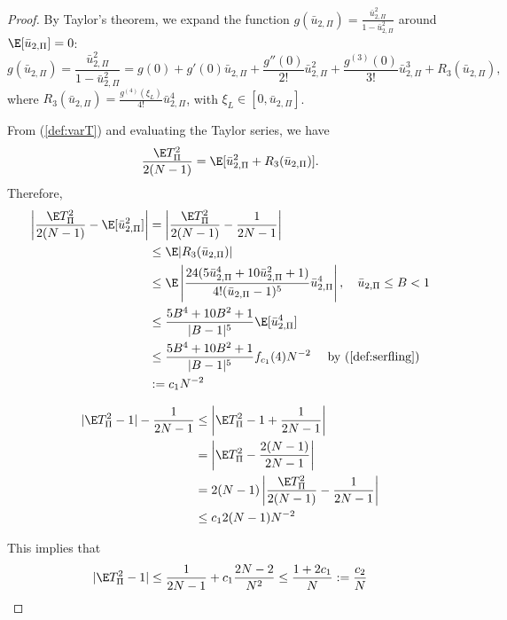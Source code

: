 \begin{proof}
  By Taylor's theorem, we expand the function $g(\bar{u}_{2,\Pi}) =
  \frac{\bar{u}_{2,\Pi}^2}{1-\bar{u}_{2,\Pi}^2}$ around $\E[\bar{u}_{2,\Pi}] = 0$: 
  \begin{equation*}
    g(\bar{u}_{2,\Pi}) = \frac{\bar{u}_{2,\Pi}^2}{1-\bar{u}_{2,\Pi}^2} = g(0) + g'(0)
    \bar{u}_{2,\Pi} + \frac{g''(0)}{2!}\bar{u}_{2,\Pi}^2 +
    \frac{g^{(3)}(0)}{3!}\bar{u}_{2,\Pi}^3 + R_3(\bar{u}_{2,\Pi}),
  \end{equation*}
  where $R_3(\bar{u}_{2,\Pi}) = \frac{g^{(4)}(\xi_L)}{4!}\bar{u}_{2,\Pi}^4$, with
  $\xi_L \in [0, \bar{u}_{2,\Pi}]$.

  From (\ref{def:varT}) and evaluating the Taylor series, we have 
  \begin{equation*}
    \frac{\E T_{\Pi}^2}{2(N-1)} = \E[\bar{u}_{2,\Pi}^2 + R_3(\bar{u}_{2,\Pi})].
  \end{equation*}
  Therefore,
  \begin{align*}
    \left | \frac{\E T_{\Pi}^2}{2(N-1)} - \E[\bar{u}_{2,\Pi}^2] \right | 
    &= \left | \frac{\E T_{\Pi}^2}{2(N-1)} - \frac{1}{2N-1} \right | \\
    &\leq  \E |R_3(\bar{u}_{2,\Pi})| \\
    &\leq \E \left | \frac{24(5\bar{u}_{2,\Pi}^4 + 10  \bar{u}_{2,\Pi}^2 +
        1)}{4!(\bar{u}_{2,\Pi}-1)^5}\bar{u}_{2,\Pi}^4  \right |, \quad
    \bar{u}_{2,\Pi} \leq B < 1 \\
    &\leq \frac{5B^4+10B^2+1}{|B-1|^5} \E [\bar{u}_{2,\Pi}^4] \\
    &\leq \frac{5B^4+10B^2+1}{|B-1|^5} f_{c_1}(4) N^{-2} \quad \text{
      by } (\ref{def:serfling}) \\
    &:= c_1 N^{-2}
  \end{align*}
  
  \begin{align*}
    |\E T_{\Pi}^2 - 1| - \frac{1}{2N-1} 
    &\leq \left | \E T_{\Pi}^2 - 1 + \frac{1}{2N-1} \right | \\
    &= \left | \E T_{\Pi}^2 - \frac{2(N-1)}{2N-1} \right | \\
    &= 2(N-1) \left | \frac{\E T_{\Pi}^2}{2(N-1)} - \frac{1}{2N-1} \right | \\
    &\leq c_1 2(N-1)N^{-2}
  \end{align*}
  
  This implies that 
  \begin{equation*}
    |\E T_{\Pi}^2 - 1| \leq \frac{1}{2N-1} + c_1 \frac{2N-2}{N^2} \leq
    \frac{1 + 2c_1}{N} := \frac{c_2}{N}
  \end{equation*}
\end{proof}

